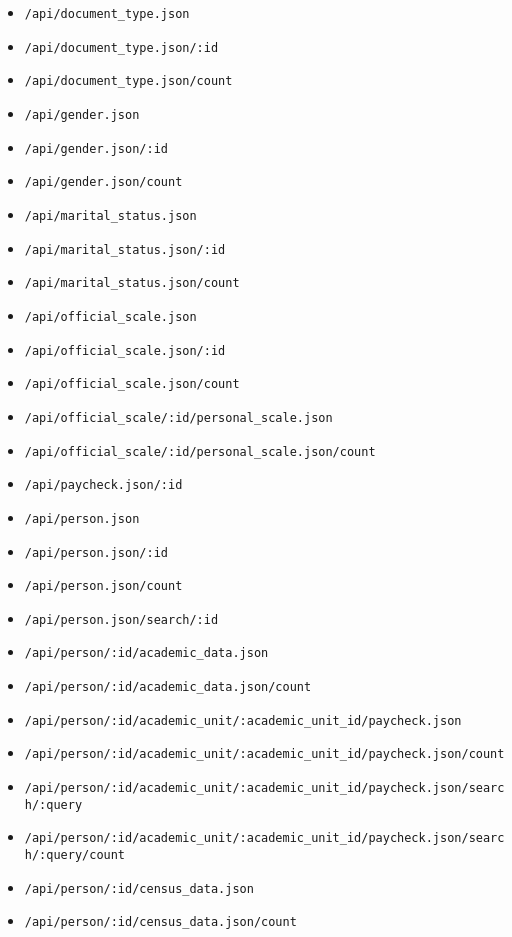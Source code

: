 \begin{itemize}
    \item \lstinline$/api/document_type.json$
    \item \lstinline$/api/document_type.json/:id$
    \item \lstinline$/api/document_type.json/count$
    \item \lstinline$/api/gender.json$
    \item \lstinline$/api/gender.json/:id$
    \item \lstinline$/api/gender.json/count$
    \item \lstinline$/api/marital_status.json$
    \item \lstinline$/api/marital_status.json/:id$
    \item \lstinline$/api/marital_status.json/count$
    \item \lstinline$/api/official_scale.json$
    \item \lstinline$/api/official_scale.json/:id$
    \item \lstinline$/api/official_scale.json/count$
    \item \lstinline$/api/official_scale/:id/personal_scale.json$
    \item \lstinline$/api/official_scale/:id/personal_scale.json/count$
    \item \lstinline$/api/paycheck.json/:id$
    \item \lstinline$/api/person.json$
    \item \lstinline$/api/person.json/:id$
    \item \lstinline$/api/person.json/count$
    \item \lstinline$/api/person.json/search/:id$
    \item \lstinline$/api/person/:id/academic_data.json$
    \item \lstinline$/api/person/:id/academic_data.json/count$
    \item \lstinline$/api/person/:id/academic_unit/:academic_unit_id/paycheck.json$
    \item \lstinline$/api/person/:id/academic_unit/:academic_unit_id/paycheck.json/count$
    \item \lstinline$/api/person/:id/academic_unit/:academic_unit_id/paycheck.json/search/:query$
    \item \lstinline$/api/person/:id/academic_unit/:academic_unit_id/paycheck.json/search/:query/count$
    \item \lstinline$/api/person/:id/census_data.json$
    \item \lstinline$/api/person/:id/census_data.json/count$

\end{itemize}
